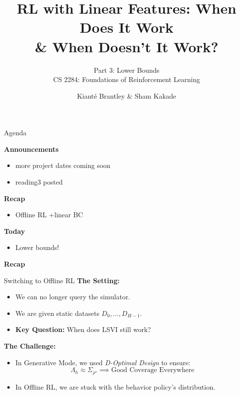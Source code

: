 \documentclass[aspectratio=169]{beamer}
\title{RL with Linear Features: When Does It Work \\ \& When Doesn't It Work?}
\subtitle{Part 3: Lower Bounds\\
CS 2284: Foundations of Reinforcement Learning}
\author{Kiant\'{e} Brantley \& Sham Kakade}
\date{}
\begin{document}

\begin{frame}[plain]
    \titlepage
\end{frame}
\addtocounter{framenumber}{-1}

\begin{frame}{Agenda}

    \textbf{Announcements}
    \begin{itemize}
    \item more project dates coming soon
    \item reading3 posted
    \end{itemize}

    \vfill

    \textbf{Recap}
    \begin{itemize}
        \item Offline RL +linear BC
    \end{itemize}

    \vfill

    \textbf{Today}
    \begin{itemize}
    \item Lower bounds!
    \end{itemize}

\end{frame}


\begin{frame}[plain]
  \vfill
  \begin{center}
    {\Huge \bfseries Recap}
  \end{center}
  \vfill
\end{frame}
\addtocounter{framenumber}{-1}

\begin{frame}{Switching to Offline RL}
    \textbf{The Setting:}
    \begin{itemize}
        \item We can no longer query the simulator.
        \item We are given static datasets $D_0, \dots, D_{H-1}$.
        \item \textbf{Key Question:} When does LSVI still work?
    \end{itemize}

    \vspace{0.3cm}

    \textbf{The Challenge:}
    \begin{itemize}
        \item In Generative Mode, we used \emph{D-Optimal Design} to ensure:
        \[
        \Lambda_h \approx  \Sigma_{\rho^\star} \implies \text{Good Coverage Everywhere}
        \]
        \item In Offline RL, we are stuck with the behavior policy's distribution.
    \end{itemize}
\end{frame}
\end{document}
